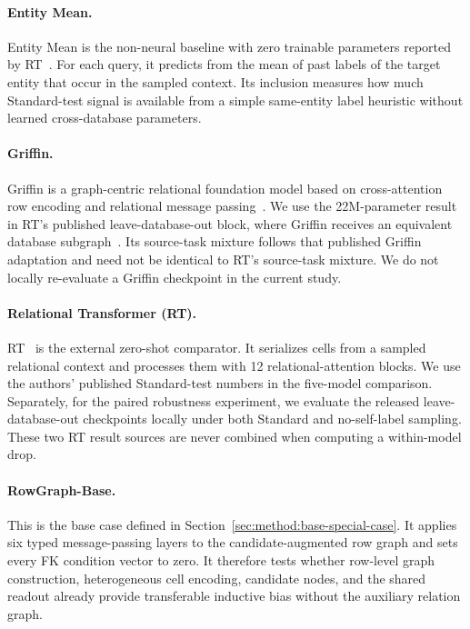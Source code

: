 \paragraph{Entity Mean.}
Entity Mean is the non-neural baseline with zero trainable parameters reported by
RT~\citep{ranjan2026rt}. For each query, it predicts from the mean of past
labels of the target entity that occur in the sampled context. Its inclusion
measures how much Standard-test signal is available from a simple
same-entity label heuristic without learned cross-database parameters.

\paragraph{Griffin.}
Griffin is a graph-centric relational foundation model based on
cross-attention row encoding and relational message
passing~\citep{wang2025griffin}. We use the 22M-parameter result in RT's
published leave-database-out block, where Griffin receives an equivalent
database subgraph~\citep{ranjan2026rt}. Its source-task mixture follows that
published Griffin adaptation and need not be identical to RT's source-task
mixture. We do not locally re-evaluate a Griffin checkpoint in the current
study.

\paragraph{Relational Transformer (RT).}
RT~\citep{ranjan2026rt} is the external zero-shot comparator. It serializes
cells from a sampled relational context and processes them with 12
relational-attention blocks. We use the authors' published Standard-test
numbers in the five-model comparison. Separately, for the paired robustness
experiment, we evaluate the released leave-database-out checkpoints locally
under both Standard and no-self-label sampling. These two RT result sources
are never combined when computing a within-model drop.

\paragraph{RowGraph-Base.}
This is the base case defined in
Section~\ref{sec:method:base-special-case}. It applies six typed
message-passing layers to the candidate-augmented row graph and sets every
FK condition vector to zero. It therefore tests whether row-level graph
construction, heterogeneous cell encoding, candidate nodes, and the shared
readout already provide transferable inductive bias without the auxiliary
relation graph.

